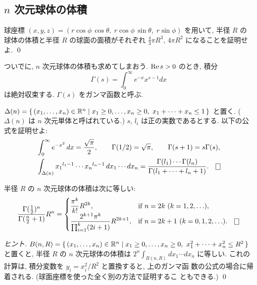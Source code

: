 \documentclass[12pt,twoside]{jarticle}
\begin{document}

\subsection{$n$ 次元球体の体積}

\begin{question}[球体の体積と球面の面積]
  球座標 %
  \(
    (x,y,z)
    =
    (r\cos\phi\,\cos\theta,\; 
     r\cos\phi\,\sin\theta,\; 
     r\sin\phi)
  \) %
  を用いて, 半径 $R$ の球体の体積と半径 $R$ の球面の面積がそれぞれ %
  $\displaystyle \frac{4}{3}\pi R^3$, %
  $\displaystyle 4 \pi R^2$ %
  になることを証明せよ. \qed
\end{question}

ついでに, $n$ 次元球体の体積も求めてしまおう. $\mathop{\mathrm{Re}}\nolimits s > 0$ のとき, 
積分
\[
  \Gamma(s) = \int_0^\infty e^{-x} x^{s-1} dx
\]
は絶対収束する. $\Gamma(s)$ をガンマ函数と呼ぶ. 

\begin{question}
  \(
    \Delta(n)
    =
    \{\, (x_1,\dots,x_n)\in{\mathbb R}^n 
    \mid  x_1 \ge 0, \dots, x_n \ge 0,\ x_1 + \dots + x_n \le 1
    \,\}
  \) と置く. %
  ($\Delta(n)$ は $n$ 次元単体と呼ばれている.) %
  $s$, $l_i$ は正の実数であるとする. 以下の公式を証明せよ:
  \begin{align*}
    & 
    \int_0^\infty e^{-x^2}\,dx = \frac{\sqrt{\pi}}{2},
    \qquad
    \Gamma(1/2) = \sqrt{\pi}, 
    \qquad
    \Gamma(s+1) = s \Gamma(s),
    \\
    &
    \int_{\Delta(n)}
    x_1{}^{l_1-1} \cdots x_n{}^{l_n-1} \,dx_1\cdots dx_n
    =
    \frac{\Gamma(l_1)\cdots\Gamma(l_n)}
         {\Gamma(l_1 + \dots + l_n + 1)}.
  \qed
  \end{align*}
\end{question}

\begin{question}
  半径 $R$ の $n$ 次元球体の体積は次に等しい:
  \[
    \frac{\Gamma(\frac{1}{2})^n}{\Gamma(\frac{n}{2}+1)} R^n
    =
    \begin{cases}
      \displaystyle
      \frac{\pi^k}{k!} R^{2k},
      & \text{if $n = 2k$ ($k=1,2,\ldots$)},
      \\
      \displaystyle
      \frac{2^{k+1}\pi^k }{\prod_{i=1}^k(2i+1)}R^{2k+1}, 
      & \text{if $n = 2k+1$ ($k=0,1,2,\ldots$)}.
    \qed
    \end{cases}
  \]
\end{question}

\begin{proof}[ヒント]
\(
  B(n,R)
  =
  \{\, (x_1,\dots,x_n)\in{\mathbb R}^n 
  \mid  x_1 \ge 0, \dots, x_n \ge 0,\ x_1^2 + \dots + x_n^2 \le R^2
  \,\}
\) と置くと, 半径 $R$ の $n$ 次元球体の体積は %
$2^n \int_{B(n,R)} dx_1\cdots dx_n$ に等しい. %
これの計算は, 積分変数を $y_i = x_i^2/R^2$ と置換すると, 上のガンマ函
数の公式の場合に帰着される. (球面座標を使った全く別の方法で証明するこ
ともできる.)
\qed
\end{proof}
\end{document}
